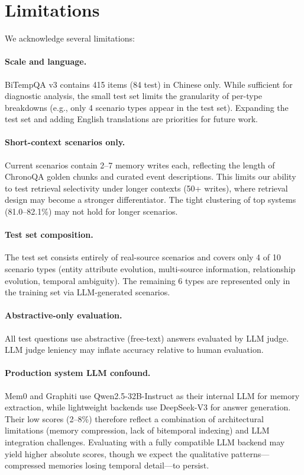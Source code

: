 \section{Limitations}
\label{sec:limitations}

We acknowledge several limitations:

\paragraph{Scale and language.}
BiTempQA v3 contains 415 items (84 test) in Chinese only. While sufficient for diagnostic analysis, the small test set limits the granularity of per-type breakdowns (e.g., only 4 scenario types appear in the test set). Expanding the test set and adding English translations are priorities for future work.

\paragraph{Short-context scenarios only.}
Current scenarios contain 2--7 memory writes each, reflecting the length of ChronoQA golden chunks and curated event descriptions.
This limits our ability to test retrieval selectivity under longer contexts (50+ writes), where retrieval design may become a stronger differentiator.
The tight clustering of top systems (81.0--82.1\%) may not hold for longer scenarios.

\paragraph{Test set composition.}
The test set consists entirely of real-source scenarios and covers only 4 of 10 scenario types (entity attribute evolution, multi-source information, relationship evolution, temporal ambiguity).
The remaining 6 types are represented only in the training set via LLM-generated scenarios.

\paragraph{Abstractive-only evaluation.}
All test questions use abstractive (free-text) answers evaluated by LLM judge.
LLM judge leniency may inflate accuracy relative to human evaluation.

\paragraph{Production system LLM confound.}
Mem0 and Graphiti use Qwen2.5-32B-Instruct as their internal LLM for memory extraction, while lightweight backends use DeepSeek-V3 for answer generation.
Their low scores (2--8\%) therefore reflect a combination of architectural limitations (memory compression, lack of bitemporal indexing) and LLM integration challenges.
Evaluating with a fully compatible LLM backend may yield higher absolute scores, though we expect the qualitative patterns---compressed memories losing temporal detail---to persist.

